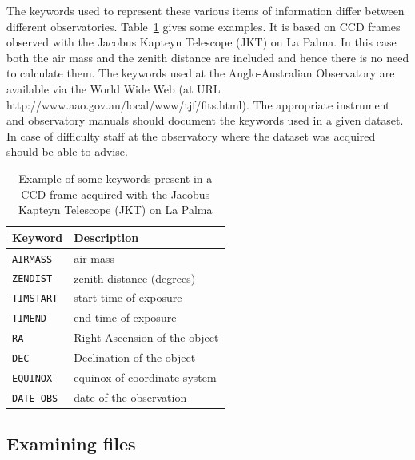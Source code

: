 \documentclass[twoside,11pt,nolof]{starlink}
\begin{document}
The keywords used to represent these various items of information differ
between different observatories.  Table~\ref{KEYWORD} gives some
examples.  It is based on CCD frames observed with the Jacobus Kapteyn
Telescope (JKT) on La Palma.  In this case both the air mass and the
zenith distance are included and hence there is no need to calculate
them.  The keywords used at the Anglo-Australian Observatory are
available via the World Wide Web (at URL
{http://www.aao.gov.au/local/www/tjf/fits.html}).  The appropriate
instrument and observatory manuals should document the keywords used
in a given dataset.  In case of difficulty staff at the observatory
where the dataset was acquired should be able to advise.

\begin{table}[htbp]

\begin{center}
\begin{tabular}{ll}
Keyword        &  Description               \\  \hline
\texttt{AIRMASS}  &  air mass                  \\
\texttt{ZENDIST}  &  zenith distance (degrees) \\
\texttt{TIMSTART} &  start time of exposure    \\
\texttt{TIMEND}   &  end time of exposure      \\
\texttt{RA}       &  Right Ascension of the object \\
\texttt{DEC}      &  Declination of the object \\
\texttt{EQUINOX}  &  equinox of coordinate system  \\
\texttt{DATE-OBS} &  date of the observation   \\
\end{tabular}
\end{center}

\begin{quote}
\caption[Example of some observation keywords]{Example
of some keywords present in a CCD frame acquired with the Jacobus
Kapteyn Telescope (JKT) on La Palma
\label{KEYWORD} }
\end{quote}

\end{table}

\subsection{Examining files}
\end{document}
